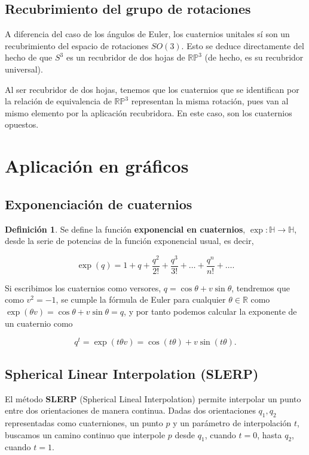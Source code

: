 \documentclass{article}
\theoremstyle{plain}
\theoremstyle{definition}
\newtheorem{definition}{Definición}
\theoremstyle{remark}
\begin{document}
\subsection{Recubrimiento del grupo de rotaciones}

A diferencia del caso de los ángulos de Euler, los cuaternios unitales sí son un recubrimiento del espacio de rotaciones
$SO(3)$. Esto se deduce directamente del hecho de que $S^3$ es un recubridor de dos hojas de $\mathbb{RP}^3$ (de hecho,
es su recubridor universal).

Al ser recubridor de dos hojas, tenemos que los cuaternios que se identifican por la relación de equivalencia de $\mathbb{RP}^3$
representan la misma rotación, pues van al mismo elemento por la aplicación recubridora. En este caso, son los cuaternios opuestos.

\section{Aplicación en gráficos}

\subsection{Exponenciación de cuaternios}
\begin{definition}
  Se define la función \textbf{exponencial en cuaternios}, $\exp \colon \mathbb{H} \to \mathbb{H}$, desde
  la serie de potencias de la función exponencial usual, es decir,

  \[
    \exp(q) =  1 + q + \frac{q^2}{2!} + \frac{q^3}{3!} + \dots + \frac{q^n}{n!} + \dots .
  \]
\end{definition}

Si escribimos los cuaternios como versores, $q = \cos \theta + v \sin \theta$, tendremos que
como $v^2 = -1$, se cumple la fórmula de Euler para cualquier $\theta \in \mathbb{R}$ como
$\exp(\theta v) = \cos \theta + v \sin \theta = q$,
y por tanto podemos calcular la exponente de un cuaternio como

\[
  q^t = \exp(t \theta v) = \cos (t \theta) + v \sin (t \theta).
\]

\subsection{Spherical Linear Interpolation (SLERP)}
El método \textbf{SLERP} (Spherical Lineal Interpolation) permite interpolar
un punto entre dos orientaciones de manera continua. Dadas dos orientaciones
$q_1,q_2$ representadas como cuaterniones, un punto $p$ y un parámetro de
interpolación $t$, buscamos un camino continuo que interpole $p$ desde $q_1$,
cuando $t=0$, hasta $q_2$, cuando $t=1$.
\end{document}
